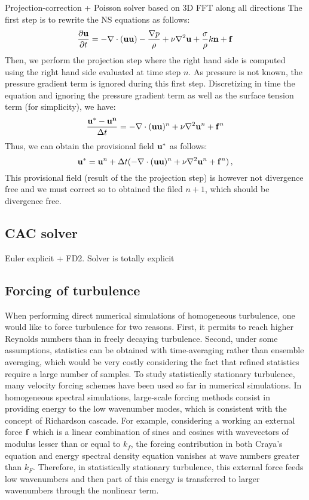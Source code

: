 \documentclass[11pt]{article}
\begin{document}
Projection-correction + Poisson solver based on 3D FFT along all directions
The first step is to rewrite the NS equations as follows:
\begin{equation}
\frac{\partial {\bf u}}{\partial t} = - \nabla \cdot ({\bf u}{\bf u}) - \frac{ \nabla p}{\rho}  +  \nu \nabla^2 {\bf u}  + \frac{ \sigma}{\rho} k {\bf n} + {\bf f}
\end{equation}
Then, we perform the projection step where the right hand side is computed using the right hand side evaluated at time step $n$.
As pressure is not known, the pressure gradient term is ignored during this first step.
Discretizing in time the equation and ignoring the pressure gradient term as well as the surface tension term (for simplicity), we have:
\begin{equation}
\frac{ {\bf u^* - u^n}}{\Delta t} = - \nabla \cdot ({\bf u}{\bf u})^n +  \nu \nabla^2 {\bf u}^n  + {\bf f}^n
\end{equation}
Thus, we can obtain the provisional field $\bf u^*$ as follows:
\begin{equation}
{\bf u^*} = {\bf u}^n + \Delta t (  - \nabla \cdot (  {\bf u}{\bf u})^n +  \nu \nabla^2 {\bf u}^n  + {\bf f}^n)\, ,
\end{equation}
This provisional field (result of the the projection step) is however not divergence free and we must correct so to obtained the filed $n+1$, which should be divergence free.

\subsection{CAC solver}

Euler explicit + FD2.
Solver is totally explicit 

\subsection{Forcing of turbulence}

When performing direct numerical simulations of homogeneous turbulence, one would like to force turbulence for two reasons. 
First, it permits to reach higher Reynolds numbers than in freely decaying turbulence. 
Second, under some assumptions, statistics can be obtained with time-averaging rather than ensemble averaging, which would be very costly considering the fact that refined statistics require a large number of samples. 
To study statistically stationary turbulence, many velocity forcing schemes have been used so far in numerical simulations. 
In homogeneous spectral simulations, large-scale forcing methods consist in providing energy to the low wavenumber modes, which is consistent with the concept of Richardson cascade. 
For example, considering a working an external force $\bf f$ which is a linear combination of sines and cosines with wavevectors of modulus lesser than or equal to $k_f$, the forcing contribution in both
Craya’s equation and energy spectral density equation vanishes at wave numbers greater than $k_F$.
Therefore, in statistically stationary turbulence, this external force feeds low wavenumbers and then part of this energy is transferred to larger wavenumbers through the nonlinear term.
\end{document}
